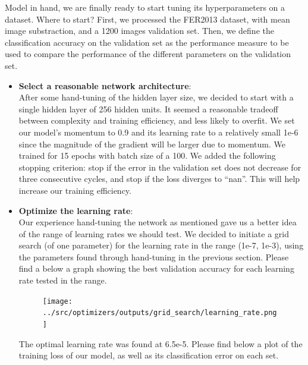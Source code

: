 Model in hand, we are finally ready to start tuning its hyperparameters on a dataset.
Where to start?
First, we processed the FER2013 dataset, with mean image substraction, and a 1200 images validation set.
Then, we define the classification accuracy on the validation set as
the performance measure to be used to compare the performance of the different parameters on the validation set.

\begin{itemize}[topsep=-10pt]
\item \textbf{Select a reasonable network architecture}:\\
  After some hand-tuning of the hidden layer size, we decided to start with a single hidden layer of 256 hidden units.
  It seemed a reasonable tradeoff between complexity and training efficiency, and less likely to overfit.
  We set our model's momentum to 0.9 and its learning rate to a relatively small 1e-6
  since the magnitude of the gradient will be larger due to momentum.
  We trained for 15 epochs with batch size of a 100.
  We added the following stopping criterion: stop if the error in the validation set does not decrease for three consecutive cycles,
  and stop if the loss diverges to ``nan''.
  This will help increase our training efficiency.

\item \textbf{Optimize the learning rate}:\\
  Our experience hand-tuning the network as mentioned gave us a better idea of the range of learning rates we should test.
  We decided to initiate a grid search (of one parameter) for the learning rate in the range (1e-7, 1e-3),
  using the parameters found through hand-tuning in the previous section.
  Please find a below a graph showing the best validation accuracy for each learning rate tested in the range.
  \begin{figure}[!ht]
      \centering
      {{\texttt{[image: ../src/optimizers/outputs/grid\_search/learning\_rate.png]}}}
  \end{figure}

  The optimal learning rate was found at 6.5e-5.
  Please find below a plot of the training loss of our model, as well as its classification error on each set.
  


\end{itemize}
